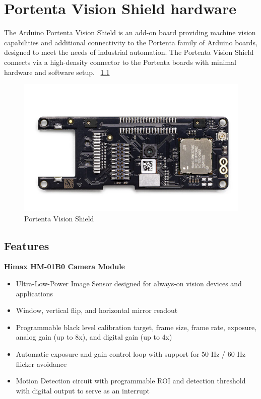 %
%

\chapter{Portenta Vision Shield hardware}
\label{Sec:VisionShieldHardware}

The Arduino Portenta Vision Shield is an add-on board providing machine vision capabilities and additional
connectivity to the Portenta family of Arduino boards, designed to meet the needs of industrial automation. The
Portenta Vision Shield connects via a high-density connector to the Portenta boards with minimal hardware and
software setup. ~\ref{VisionShield} \cite{arduinoVisionShield:2024}

\begin{figure}
	\begin{center}
		\includegraphics[width=0.7\linewidth]{Images/VisionShield/VisionShield.png}
		\caption{Portenta Vision Shield}
		\label{VisionShield}
	\end{center}
\end{figure}

\section{Features}
	
	\textbf{Himax HM-01B0 Camera Module}
	
	\begin{itemize}
		\item Ultra-Low-Power Image Sensor designed for always-on vision devices and applications
		\item Window, vertical flip, and horizontal mirror readout
		\item Programmable black level calibration target, frame size, frame rate, exposure, analog gain (up to 8x), and digital gain (up to 4x)
		\item Automatic exposure and gain control loop with support for 50 Hz / 60 Hz flicker avoidance
		\item Motion Detection circuit with programmable ROI and detection threshold with digital output to serve as an interrupt
	\end{itemize}
	
